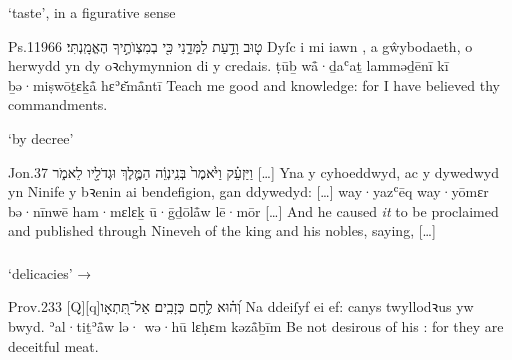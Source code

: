 \begin{frame}{\ex {} ‘taste’, in a figurative sense}
	\begin{example}{Ps.}{119}{66}{}{}
		\quoling
		{ט֤וּב  וָדַ֣עַת לַמְּדֵ֑נִי כִּ֖י בְמִצְוֺתֶ֣יךָ הֶאֱמָֽנְתִּי׃}
		{Dyſc i mi iawn , a gŵybodaeth, o herwydd yn dy oꝛchymynnion di y credais.}
		{ṭūḇ  wå̄·ḏaʿaṯ lamməḏēnī kī ḇə·miṣwōṯɛḵå̄ hɛʾɛ̆må̄ntī}
		{Teach me good  and knowledge: for I have believed thy commandments.}
	\end{example}
\end{frame}



\begin{frame}{\ex {} ‘by decree’}
\begin{example}{Jon.}{3}{7}{}{}
	\quoling
	{וַיַּזְעֵ֗ק וַיֹּ֙אמֶר֙ בְּנִֽינְוֵ֔ה  הַמֶּ֛לֶךְ וּגְדֹלָ֖יו לֵאמֹ֑ר […]}
	{Yna y cyhoeddwyd, ac y dywedwyd yn Ninife  y bꝛenin ai bendefigion, gan ddywedyd: […]}
	{way·yazʿēq way·yōmɛr bə·nīnwē  ham·mɛlɛḵ ū·ḡḏōlå̄w lē·mōr […]}
	{And he caused \textit{it} to be proclaimed and published through Nineveh  of the king and his nobles, saying, […]}
\end{example}
\end{frame}



\subsubsection{}

\begin{frame}{\ex {} ‘delicacies’ → }
	\begin{example}{Prov.}{23}{3}{}{}
		\quoling
		{אַל־תִּ֭תְאָו‪[Q]‬‪[q]‬  וְ֝ה֗וּא לֶ֣חֶם כְּזָבִֽים׃}
		{Na ddeiſyf ei  ef: canys twyllodꝛus yw bwyd.}
		{ʾal·tiṯʾå̄w lə· wə·hū lɛḥɛm kəzå̄ḇīm}
		{Be not desirous of his : for they are deceitful meat.}
	\end{example}
\end{frame}
